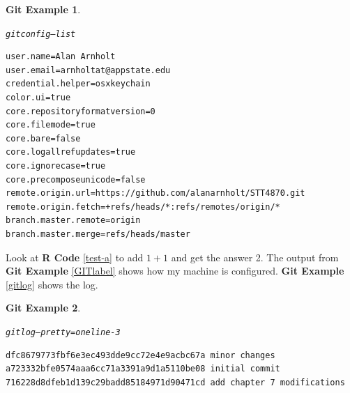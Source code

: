 \documentclass{article}\usepackage[]{graphicx}\usepackage[]{color}
\makeatletter
\newenvironment{kframe}{%
 \def\at@end@of@kframe{}%
 \ifinner\ifhmode%
  \def\at@end@of@kframe{\end{minipage}}%
  \begin{minipage}{\columnwidth}%
 \fi\fi%
 \def\FrameCommand##1{\hskip\@totalleftmargin \hskip-\fboxsep
 \colorbox{shadecolor}{##1}\hskip-\fboxsep
     \hskip-\linewidth \hskip-\@totalleftmargin \hskip\columnwidth}%
 \MakeFramed {\advance\hsize-\width
   \@totalleftmargin\z@ \linewidth\hsize
   \@setminipage}}%
 {\par\unskip\endMakeFramed%
 \at@end@of@kframe}
\newenvironment{knitrout}{}{} %
\theoremstyle{rcode}
\newtheorem{GIT}{Git Example}[section]
\makeatother
\begin{document}
\begin{knitrout}
\color{fgcolor}\begin{kframe}
\begin{GIT}\label{GITlabel}\hfill{}\begin{alltt}
git config --list
\end{alltt}

\begin{verbatim}
user.name=Alan Arnholt
user.email=arnholtat@appstate.edu
credential.helper=osxkeychain
color.ui=true
core.repositoryformatversion=0
core.filemode=true
core.bare=false
core.logallrefupdates=true
core.ignorecase=true
core.precomposeunicode=false
remote.origin.url=https://github.com/alanarnholt/STT4870.git
remote.origin.fetch=+refs/heads/*:refs/remotes/origin/*
branch.master.remote=origin
branch.master.merge=refs/heads/master
\end{verbatim}
\end{GIT}\end{kframe}
\end{knitrout}


Look at \textbf{R Code} \vref{test-a} to add $1 + 1$ and get the answer 2. The output from \textbf{Git Example} \vref{GITlabel} shows how my machine is configured. \textbf{Git Example} \vref{gitlog} shows the log.

\begin{knitrout}
\color{fgcolor}\begin{kframe}
\begin{GIT}\label{gitlog}\hfill{}\begin{alltt}
git log --pretty=oneline -3
\end{alltt}

\begin{verbatim}
dfc8679773fbf6e3ec493dde9cc72e4e9acbc67a minor changes
a723332bfe0574aaa6cc71a3391a9d1a5110be08 initial commit
716228d8dfeb1d139c29badd85184971d90471cd add chapter 7 modifications
\end{verbatim}
\end{GIT}\end{kframe}
\end{knitrout}
\end{document}
